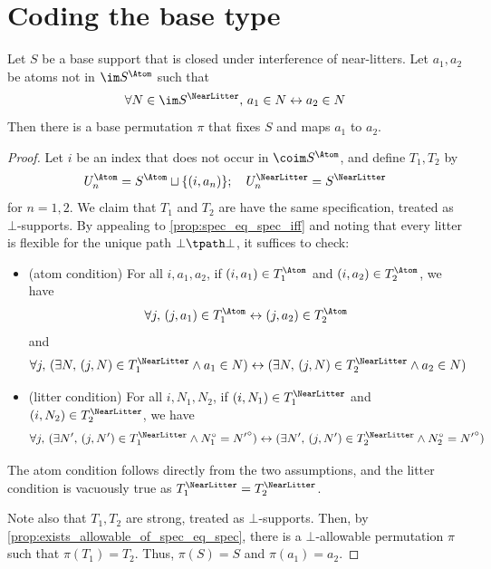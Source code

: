 \section{Coding the base type}
\begin{proposition}
  \label{prop:exists_swap}
  Let \( S \) be a base support that is closed under interference of near-litters.
  Let \( a_1, a_2 \) be atoms not in \( \im S^\Atom \) such that
  \[ \forall N \in \im S^\NearLitter,\, a_1 \in N \leftrightarrow a_2 \in N \]
  Then there is a base permutation \( \pi \) that fixes \( S \) and maps \( a_1 \) to \( a_2 \).
\end{proposition}
\begin{proof}
  Let \( i \) be an index that does not occur in \( \coim S^\Atom \), and define \( T_1, T_2 \) by
  \[ U_n^\Atom = S^\Atom \sqcup \{ (i, a_n) \};\quad U_n^\NearLitter = S^\NearLitter \]
  for \( n = 1, 2 \).
  We claim that \( T_1 \) and \( T_2 \) are have the same specification, treated as \( \bot \)-supports.
  By appealing to \cref{prop:spec_eq_spec_iff} and noting that every litter is flexible for the unique path \( \bot \tpath \bot \), it suffices to check:
  \begin{itemize}
    \item (atom condition) For all \( i, a_1, a_2 \), if \( (i, a_1) \in T_1^\Atom \) and \( (i, a_2) \in T_2^\Atom \), we have
    \[ \forall j,\, (j, a_1) \in T_1^\Atom \leftrightarrow (j, a_2) \in T_2^\Atom \]
    and
    \[ \forall j,\, (\exists N,\, (j, N) \in T_1^\NearLitter \wedge a_1 \in N) \leftrightarrow (\exists N,\, (j, N) \in T_2^\NearLitter \wedge a_2 \in N) \]
    \item (litter condition) For all \( i, N_1, N_2 \), if \( (i, N_1) \in T_1^\NearLitter \) and \( (i, N_2) \in T_2^\NearLitter \), we have
    \[ \forall j,\, (\exists N',\, (j, N') \in T_1^\NearLitter \wedge N_1^\circ = {N'}^\circ) \leftrightarrow (\exists N',\, (j, N') \in T_2^\NearLitter \wedge N_2^\circ = {N'}^\circ) \]
  \end{itemize}
  The atom condition follows directly from the two assumptions, and the litter condition is vacuously true as \( T_1^\NearLitter = T_2^\NearLitter \).

  Note also that \( T_1, T_2 \) are strong, treated as \( \bot \)-supports.
  Then, by \cref{prop:exists_allowable_of_spec_eq_spec}, there is a \( \bot \)-allowable permutation \( \pi \) such that \( \pi(T_1) = T_2 \).
  Thus, \( \pi(S) = S \) and \( \pi(a_1) = a_2 \).
\end{proof}
